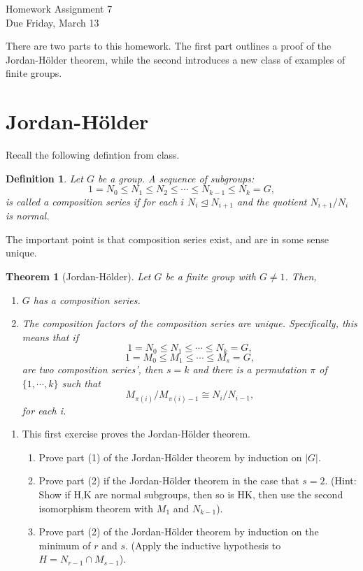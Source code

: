 \documentclass[11pt]{article}
\newtheorem{theorem}{Theorem}
\newtheorem{definition}{Definition}
\begin{document}
\begin{center}
\Large {Homework Assignment 7}\\
\small {Due Friday, March 13}
\end{center}
There are two parts to this homework.  The first part outlines a proof of the Jordan-H\"older theorem, while the second introduces a new class of examples of finite groups.
\section{Jordan-H\"older}
Recall the following defintion from class.
\begin{definition}
  Let $G$ be a group.  A sequence of subgroups:
  \[1 = N_0\le N_1\le N_2\le\cdots\le N_{k-1}\le N_k = G,\]
  is called a \textit{composition series} if for each $i$ $N_i\unlhd N_{i+1}$ and the quotient $N_{i+1}/N_i$ is normal.
\end{definition}
The important point is that composition series exist, and are in some sense unique.
\begin{theorem}[Jordan-H\"older]
  Let $G$ be a finite group with $G\not=1$.  Then,
  \begin{enumerate}[(1)]
    \item $G$ has a composition series.
    \item The composition factors of the composition series are unique.  Specifically, this means that if
    \[1 = N_0\le N_1\le\cdots\le N_k = G,\]
    \[1 = M_0\le M_1\le\cdots\le M_s = G,\]
    are two composition series', then $s = k$ and there is a permutation $\pi$ of $\{1,\cdots,k\}$ such that
    \[M_{\pi(i)}/M_{\pi(i)-1}\cong N_i/N_{i-1},\]
    for each i.
  \end{enumerate}
\end{theorem}
\begin{enumerate}
  \item This first exercise proves the Jordan-H\"older theorem.
  \begin{enumerate}
    \item Prove part (1) of the Jordan-H\"older theorem by induction on $|G|$.
    \item Prove part (2) if the Jordan-H\"older theorem in the case that $s = 2$.  (Hint: Show if H,K are normal subgroups, then so is HK, then use the second isomorphism theorem with $M_1$ and $N_{k-1}$).
    \item Prove part (2) of the Jordan-H\"older theorem by induction on the minimum of $r$ and $s$.  (Apply the inductive hypothesis to $H = N_{r-1}\cap M_{s-1}$).
  \end{enumerate}
\end{enumerate}
\end{document}
